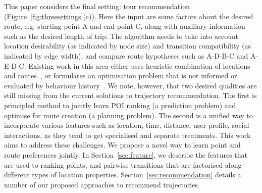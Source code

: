 This paper considers the final setting: tour recommendation (Figure~\ref{fig:threesettings}(c)). Here the input are some factors about the desired route, e.g. starting point A and end point C, along with auxiliary information such as the desired length of trip. The algorithm needs to take into account location desirability (as indicated by node size) and transition compatibility (as indicated by edge width), and compare route hypotheses such as A-D-B-C and A-E-D-C. Existing work in this area either uses heuristic combination of locations and routes~\cite{lu2010photo2trip,ijcai15,lu2012personalized}, or formulates an optimisation problem that is not informed or evaluated by behaviour history~\cite{gioniswsdm14,chen2015tripplanner}. 
%
We note, however, that two desired qualities are still 
missing from the current solutions to trajectory recommendation. 
The first is principled method to jointly learn POI ranking (a prediction problem)
and optimise for route creation (a planning problem).
The second is a unified way to incorporate various features 
such as location, time, distance, user profile, social interactions, 
as they tend to get specialised and separate treatments. 
This work aims to address these challenges. %
We propose a novel way to learn point and route preferences jointly.
In Section~\ref{sec:feature}, we describe the features that are used to ranking points,
and pairwise transitions that are factorised along %
different types of location properties.
Section~\ref{sec:recommendation} details a number of our proposed approaches to recommend trajectories.
